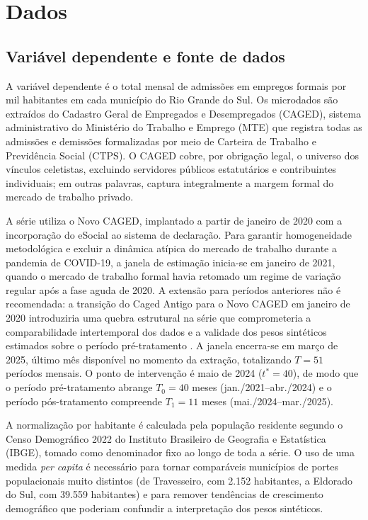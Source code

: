 \documentclass[a4paper,12pt]{article}
\begin{document}
\section{Dados}
\label{sec:dados}


\subsection{Variável dependente e fonte de dados}
\label{sub:variaveis}

A variável dependente é o total mensal de admissões em empregos formais por mil
habitantes em cada município do Rio Grande do Sul. Os microdados são extraídos do
Cadastro Geral de Empregados e Desempregados (CAGED), sistema administrativo do
Ministério do Trabalho e Emprego (MTE) que registra todas as admissões e demissões
formalizadas por meio de Carteira de Trabalho e Previdência Social (CTPS). O CAGED
cobre, por obrigação legal, o universo dos vínculos celetistas, excluindo servidores
públicos estatutários e contribuintes individuais; em outras palavras, captura
integralmente a margem formal do mercado de trabalho privado.

A série utiliza o Novo CAGED, implantado a partir de janeiro de 2020 com a incorporação
do eSocial ao sistema de declaração. Para garantir homogeneidade metodológica e excluir
a dinâmica atípica do mercado de trabalho durante a pandemia de COVID-19, a janela de
estimação inicia-se em janeiro de 2021, quando o mercado de trabalho formal havia
retomado um regime de variação regular após a fase aguda de 2020. A extensão para
períodos anteriores não é recomendada: a transição do Caged Antigo para o Novo CAGED
em janeiro de 2020 introduziria uma quebra estrutural na série que comprometeria a
comparabilidade intertemporal dos dados e a validade dos pesos sintéticos estimados
sobre o período pré-tratamento \cite{brasil2019portaria}.
A janela encerra-se em março de 2025, último mês disponível no momento da extração,
totalizando $T = 51$ períodos mensais. O ponto de intervenção é maio de 2024
($t^* = 40$), de modo que o período pré-tratamento abrange $T_0 = 40$ meses
(jan./2021–abr./2024) e o período pós-tratamento compreende $T_1 = 11$ meses
(mai./2024–mar./2025).

A normalização por habitante é calculada pela população residente segundo o Censo
Demográfico 2022 do Instituto Brasileiro de Geografia e Estatística (IBGE), tomado
como denominador fixo ao longo de toda a série. O uso de uma medida \textit{per capita}
é necessário para tornar comparáveis municípios de portes populacionais muito distintos
(de Travesseiro, com 2.152 habitantes, a Eldorado do Sul, com 39.559 habitantes) e para
remover tendências de crescimento demográfico que poderiam confundir a interpretação
dos pesos sintéticos.
\end{document}
